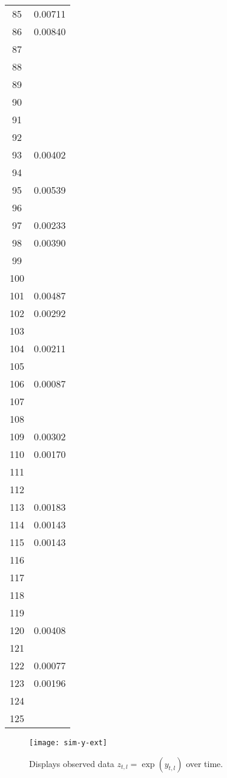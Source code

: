 \documentclass{elsarticle}
\begin{document}
\begin{center}
\begin{longtable}{|c|c|}
  85 & 0.00711 \\
  86 & 0.00840 \\
  87 &  \\
  88 &  \\
  89 &  \\
  90 &  \\
  91 &  \\
  92 &  \\
  93 & 0.00402 \\
  94 &  \\
  95 & 0.00539 \\
  96 &  \\
  97 & 0.00233 \\
  98 & 0.00390 \\
  99 &  \\
  100 &  \\
  101 & 0.00487 \\
  102 & 0.00292 \\
  103 &  \\
  104 & 0.00211 \\
  105 &  \\
  106 & 0.00087 \\
  107 &  \\
  108 &  \\
  109 & 0.00302 \\
  110 & 0.00170 \\
  111 &  \\
  112 &  \\
  113 & 0.00183 \\
  114 & 0.00143 \\
  115 & 0.00143 \\
  116 &  \\
  117 &  \\
  118 &  \\
  119 &  \\
  120 & 0.00408 \\
  121 &  \\
  122 & 0.00077 \\
  123 & 0.00196 \\
  124 &  \\
  125 &
\label{fig:z}
\end{longtable}
\end{center}

\clearpage

\begin{figure}[ht]
\texttt{[image: sim-y-ext]}
\caption{Displays observed data $z_{t,l} = \exp(y_{t,l})$ over time.}
\end{figure}
\end{document}
